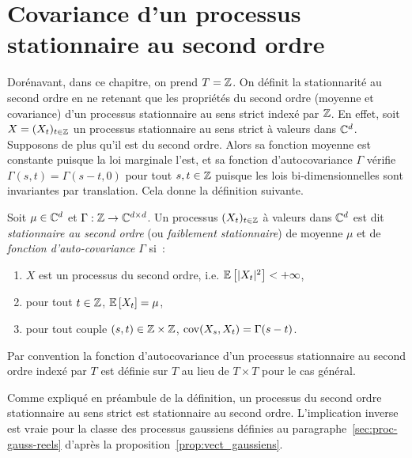 \section{Covariance d'un processus stationnaire au second
ordre}

Dor\'enavant, dans ce chapitre, on prend $T=\mathbb{Z}$.  On d\'efinit la stationnarit\'e
au second ordre en ne retenant que les propri\'et\'es du second ordre (moyenne et
covariance) d'un processus stationnaire au sens strict index\'e par $\mathbb{Z}$.  En
effet, soit $X=(X_{t})_{t \in \mathbb{Z}}$ un processus stationnaire au sens strict
\`a valeurs dans $\mathbb{C}^d$. Supposons de plus qu'il est du second ordre. Alors sa
fonction moyenne est constante puisque la loi marginale l'est, et sa fonction
d'autocovariance $\Gamma$ v\'erifie $\Gamma(s,t)=\Gamma(s-t,0)$ pour tout
$s,t\in\mathbb{Z}$ puisque les lois bi-dimensionnelles sont invariantes par
translation.  Cela donne la d\'efinition suivante.
\begin{definition}\label{def:statio_sec_ordre}
  Soit $\mu\in\mathbb{C}^d$ et $\Gamma:\mathbb{Z}\to\mathbb{C}^{d\times d}$.  Un processus
  $(X_{t})_{t \in \mathbb{Z}}$ \`a valeurs dans $\mathbb{C}^d$ est dit \emph{stationnaire
    au second ordre} (ou \emph{faiblement stationnaire}) de moyenne $\mu$ et de
  \emph{fonction d'auto-covariance} $\Gamma$ si~:
\begin{enumerate}[label=(\alph*)]
\item $X$ est un processus du second ordre, i.e.
${\mathbb E}\left[ |X_{t}|^2 \right]<+\infty$,
\item pour tout $t \in \mathbb{Z}$, ${\mathbb E}\left[  X_{t}
 \right]=\mu$,
\item\label{eq:diffgamma} pour tout couple $(s,t) \in \mathbb{Z} \times \mathbb{Z}$, $\mathrm{cov}(X_s,X_t)= \Gamma(s-t)$.
\end{enumerate}
\end{definition}

Par convention la fonction d'autocovariance d'un processus stationnaire au
second ordre index\'e par $T$ est d\'efinie sur $T$ au lieu de $T\times T$ pour le
cas g\'en\'eral.

Comme expliqu\'e en pr\'eambule de la d\'efinition, un processus du second ordre
stationnaire au sens strict est stationnaire au second ordre.  L'implication
inverse est vraie pour la classe des processus gaussiens d\'efinies au
paragraphe~\ref{sec:proc-gauss-reels} d'apr\`es la
proposition~\ref{prop:vect_gaussiens}.



